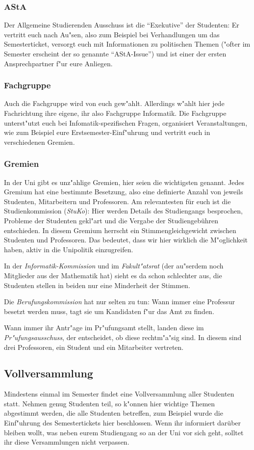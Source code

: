 \subsubsection*{AStA}
Der Allgemeine Studierenden Ausschuss ist die "`Exekutive"' der 
Studenten: Er vertritt euch nach Au"sen, also zum Beispiel bei 
Verhandlungen um das Semesterticket, versorgt euch mit Informationen 
zu politischen Themen ("ofter im Semester erscheint der so genannte 
"`AStA-Issue"') und ist einer der ersten Ansprechpartner f"ur eure 
Anliegen.

\subsubsection*{Fachgruppe}
Auch die Fachgruppe wird von euch gew"ahlt.
Allerdings w"ahlt hier jede Fachrichtung ihre eigene, ihr also 
Fachgruppe Informatik. Die Fachgruppe unterst"utzt euch bei 
Infomatik-spezifischen Fragen, organisiert Veranstaltungen, wie zum 
Beispiel eure Erstsemester-Einf"uhrung und vertritt euch in 
verschiedenen Gremien.

\subsubsection*{Gremien}
In der Uni gibt es unz"ahlige Gremien, hier seien die wichtigsten
genannt. Jedes Gremium hat eine bestimmte Besetzung, also eine 
definierte Anzahl von jeweils Studenten, Mitarbeitern und Professoren.
Am relevantesten für euch ist die Studienkommission (\emph{StuKo}):
Hier werden Details des Studiengangs besprochen, Probleme der 
Studenten gekl"art und die Vergabe der Studiengebühren entschieden.
In diesem Gremium herrscht ein Stimmengleichgewicht zwischen 
Studenten und Professoren. Das bedeutet, dass wir hier wirklich 
die M"oglichkeit haben, aktiv in die Unipolitik einzugreifen.

In der \emph{Informatik-Kommission} und im \emph{Fakult"atsrat} 
(der au"serdem noch Mitglieder aus der Mathematik hat) sieht es da 
schon schlechter aus, die Studenten stellen in beiden nur eine 
Minderheit der Stimmen.

Die \emph{Berufungskommission} hat nur selten zu tun:
Wann immer eine Professur besetzt werden muss, tagt sie um 
Kandidaten f"ur das Amt zu finden.

Wann immer ihr Antr"age im Pr"ufungsamt stellt, landen diese 
im \emph{Pr"ufungsausschuss}, der entscheidet, ob diese rechtm"a"sig 
sind. In diesem sind drei Professoren, ein Student und ein 
Mitarbeiter vertreten.

\subsection*{Vollversammlung}
Mindestens einmal im Semester findet eine Vollversammlung aller 
Studenten statt.
Nehmen genug Studenten teil, so k"onnen hier wichtige Themen 
abgestimmt werden, die alle Studenten betreffen, zum Beispiel 
wurde die Einf"uhrung des Semestertickets hier beschlossen.
Wenn ihr informiert darüber bleiben wollt, was neben eurem 
Studiengang so an der Uni vor sich geht, solltet ihr diese 
Versammlungen nicht verpassen.